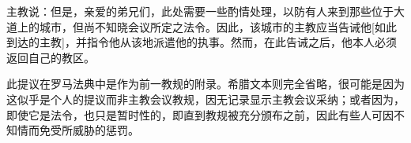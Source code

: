 主教说：但是，亲爱的弟兄们，此处需要一些酌情处理，以防有人来到那些位于大道上的城市，但尚不知晓会议所定之法令。因此，该城市的主教应当告诫他[如此到达的主教]，并指令他从该地派遣他的执事。然而，在此告诫之后，他本人必须返回自己的教区。\par

此提议在罗马法典中是作为前一教规的附录。希腊文本则完全省略，很可能是因为这似乎是个人的提议而非主教会议教规，因无记录显示主教会议采纳；或者因为，即使它是法令，也只是暂时性的，即直到教规被充分颁布之前，因此有些人可因不知情而免受所威胁的惩罚。\par

